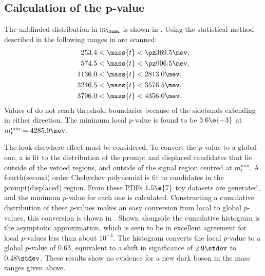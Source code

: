 
\subsection[Calculation of the $p$-value]
{Calculation of the $\boldsymbol{p}$-value}

The unblinded distribution in $m_{\mumu}$ is shown in .
Using the statistical method described in  the following ranges in 
are scanned:
\begin{align*}
  253.4 &< \mass{t} < \pz369.5 \mev, \\
  574.5 &< \mass{t} < \pz906.5 \mev, \\
  1136.0 &< \mass{t} < 2813.0 \mev, \\
  3246.5 &< \mass{t} < 3576.5 \mev, \\
  3796.0 &< \mass{t} < 4356.0 \mev.
\end{align*}
Values of  do not reach threshold boundaries because of the sidebands extending in either
direction.
The minimum local $p$-value is found to be $3.6\e{-3}$ at $m_{t}^\mathrm{min} = 4285.0\mev$.

The look-elsewhere effect must be considered.
To convert the $p$-value to a global one, a \PDF is fit to the \mass{\mumu} distribution of the
prompt and displaced \btokstrdb candidates that lie outside of the vetoed regions, and outside of
the signal region centred at $m_t^\mathrm{min}$.
A fourth(second) order Chebychev polynomial is fit to candidates in the prompt(displaced) region.
From these \glspl{PDF} $1.5\e{7}$ toy datasets are generated, and the minimum $p$-value for each
one is calculated.
Constructing a cumulative distribution of these $p$-values makes an easy conversion from local to
global $p$-values, this conversion is shown in .
Shown alongside the cumulative histogram is the asymptotic approximation, which is seen to be in
excellent agreement for local $p$-values less than about $10^{-4}$.
The histogram converts the local $p$-value to a global $p$-value of $0.63$, equivalent to a shift
in significance of $2.9\stdev$ to $0.48\stdev$.
These results show no evidence for a new dark boson in the mass ranges given above.

